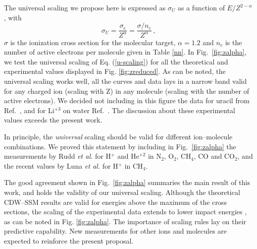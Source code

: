 \documentclass[10pt,showpacs,showkeys,twocolumn]{revtex4}
\begin{document}
 
The universal scaling we propose here is expressed as $\sigma_U$ as a function of $E/Z^{2-\alpha}$, with
 \begin{equation}
     \sigma_U=\frac{\sigma_e}{Z^{\alpha}}=\frac{\sigma/n_e}{Z^{\alpha}}\,,
     \label{u-scaling}
 \end{equation}
$\sigma$ is the ionization cross section for the molecular target, $\alpha=1.2$ and $n_e$ is the number of active electrons per molecule given in Table \ref{nn}. %
In Fig.~\ref{fig:zalpha}, we test the universal scaling of Eq. (\ref{u-scaling}) %
for all the theoretical and experimental values displayed in Fig. \ref{fig:zreduced}. 
As can be noted, the universal scaling works well, all the curves and data lays in a narrow band valid for any charged ion (scaling with Z) in any molecule (scaling with the number of active electrons). We decided not including in this figure the data for uracil from Ref.~\cite{agnihotri2012,agnihotri2013}, and for Li$^{+3}$ on water Ref.~\cite{Luna_Li_water}. The discussion about these experimental values exceeds the present work. %


In principle, the \textit{universal} scaling should be valid for different ion--molecule combinations. 
We proved this statement by including in Fig.~\ref{fig:zalpha} the measurements by Rudd \textit{et al.} \cite{Rudd85,Rudd1983} for H$^{+}$ and He$^{+2}$ in N$_2$, O$_2$, CH$_4$, CO and CO$_2$, and the recent values by Luna \textit{et al.} \cite{Luna2019} for H$^{+}$ in CH$_4$. 

The good agreement shown in Fig.~\ref{fig:zalpha} summaries the main result of this work, and holds the validity of our universal scaling. Although the theoretical CDW--SSM results  %
are valid for energies above the maximum of the cross sections, the scaling of the experimental data extends to lower impact energies%
, as can be noted in Fig. \ref{fig:zalpha}.
The importance of scaling rules lay on their predictive capability. New measurements for other ions and molecules are expected to reinforce the present proposal. 

\end{document}
